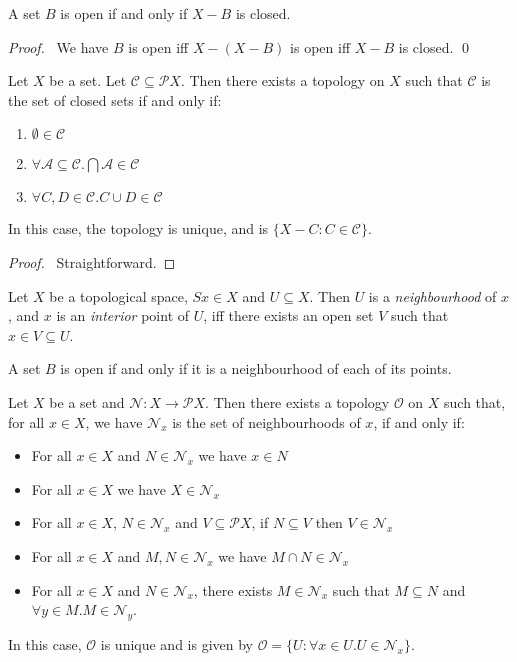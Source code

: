 \begin{prop}
A set $B$ is open if and only if $X - B$ is closed.
\end{prop}

\begin{proof}
\pf\ We have $B$ is open iff $X - (X - B)$ is open iff $X - B$ is closed. \qed
\end{proof}

\begin{thm}
Let $X$ be a set. Let $\mathcal{C} \subseteq \mathcal{P} X$. Then there exists a topology on $X$ such that $\mathcal{C}$ is the set of closed sets if and only if:
\begin{enumerate}
\item $\emptyset \in \mathcal{C}$
\item $\forall \mathcal{A} \subseteq \mathcal{C}. \bigcap \mathcal{A} \in \mathcal{C}$
\item $\forall C,D \in \mathcal{C}. C \cup D \in \mathcal{C}$
\end{enumerate}
In this case, the topology is unique, and is $\{ X - C : C \in \mathcal{C} \}$.
\end{thm}

\begin{proof}
\pf\ Straightforward.
\end{proof}

\begin{df}[Neighbourhood]
Let $X$ be a topological space, $Sx \in X$ and $U \subseteq X$. Then $U$ is a \emph{neighbourhood} of $x$, and $x$ is an \emph{interior} point of $U$, iff there exists an open set $V$ such that $x \in V \subseteq U$.
\end{df}

\begin{prop}
A set $B$ is open if and only if it is a neighbourhood of each of its points.
\end{prop}

\begin{prop}
Let $X$ be a set and $\mathcal{N} : X \rightarrow \mathcal{P} X$. Then there exists a topology $\mathcal{O}$ on $X$ such that, for all $x \in X$, we have $\mathcal{N}_x$ is the set of neighbourhoods of $x$, if and only if:
\begin{itemize}
\item For all $x \in X$ and $N \in \mathcal{N}_x$ we have $x \in N$
\item For all $x \in X$ we have $X \in \mathcal{N}_x$
\item For all $x \in X$, $N \in \mathcal{N}_x$ and $V \subseteq \mathcal{P} X$, if $N \subseteq V$ then $V \in \mathcal{N}_x$
\item For all $x \in X$ and $M, N \in \mathcal{N}_x$ we have $M \cap N \in \mathcal{N}_x$
\item For all $x \in X$ and $N \in \mathcal{N}_x$, there exists $M \in \mathcal{N}_x$ such that $M \subseteq N$ and $\forall y \in M. M \in \mathcal{N}_y$.
\end{itemize}
In this case, $\mathcal{O}$ is unique and is given by $\mathcal{O} = \{ U : \forall x \in U. U \in \mathcal{N}_x \}$.
\end{prop}


